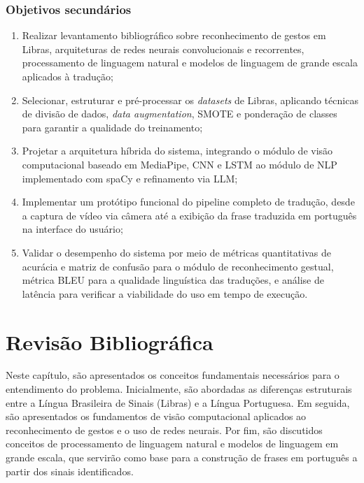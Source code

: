 \documentclass[
    12pt,                %
    openright,           %
    oneside,             %
    a4paper,             %
    english,             %
    brazil               %
]{abntex2}
\begin{document}
\subsection{Objetivos secundários}

\begin{enumerate}
    \item Realizar levantamento bibliográfico sobre reconhecimento de gestos em Libras, arquiteturas de redes neurais convolucionais e recorrentes, processamento de linguagem natural e modelos de linguagem de grande escala aplicados à tradução;
    \item Selecionar, estruturar e pré-processar os \textit{datasets} de Libras, aplicando técnicas de divisão de dados, \textit{data augmentation}, SMOTE e ponderação de classes para garantir a qualidade do treinamento;
    \item Projetar a arquitetura híbrida do sistema, integrando o módulo de visão computacional baseado em MediaPipe, CNN e LSTM ao módulo de NLP implementado com spaCy e refinamento via LLM;
    \item Implementar um protótipo funcional do pipeline completo de tradução, desde a captura de vídeo via câmera até a exibição da frase traduzida em português na interface do usuário;
    \item Validar o desempenho do sistema por meio de métricas quantitativas de acurácia e matriz de confusão para o módulo de reconhecimento gestual, métrica BLEU para a qualidade linguística das traduções, e análise de latência para verificar a viabilidade do uso em tempo de execução.
\end{enumerate}

\chapter{Revisão Bibliográfica}
\label{cap:revisao}

Neste capítulo, são apresentados os conceitos fundamentais necessários para o entendimento do problema. Inicialmente, são abordadas as diferenças estruturais entre a Língua Brasileira de Sinais (Libras) e a Língua Portuguesa. Em seguida, são apresentados os fundamentos de visão computacional aplicados ao reconhecimento de gestos e o uso de redes neurais. Por fim, são discutidos conceitos de processamento de linguagem natural e modelos de linguagem em grande escala, que servirão como base para a construção de frases em português a partir dos sinais identificados.
\end{document}
